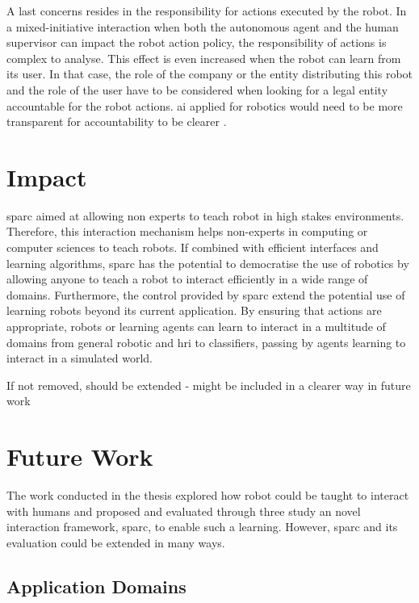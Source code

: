 A last concerns resides in the responsibility for actions executed by the robot. In a mixed-initiative interaction when both the autonomous agent and the human supervisor can impact the robot action policy, the responsibility of actions is complex to analyse. This effect is even increased when the robot can learn from its user. In that case, the role of the company or the entity distributing this robot and the role of the user have to be considered when looking for a legal entity accountable for the robot actions. \gls{ai} applied for robotics would need to be more transparent for accountability to be clearer \citep{wachter2017transparent}.

\section{Impact}

\gls{sparc} aimed at allowing non experts to teach robot in high stakes environments. Therefore, this interaction mechanism helps non-experts in computing or computer sciences to teach robots. If combined with efficient interfaces and learning algorithms, \gls{sparc} has the potential to democratise the use of robotics by allowing anyone to teach a robot to interact efficiently in a wide range of domains. Furthermore, the control provided by \gls{sparc} extend the potential use of learning robots beyond its current application. By ensuring that actions are appropriate, robots or learning agents can learn to interact in a multitude of domains from general robotic and \gls{hri} to classifiers, passing by agents learning to interact in a simulated world.

If not removed, should be extended - might be included in a clearer way in future work
\section{Future Work}

The work conducted in the thesis explored how robot could be taught to interact with humans and proposed and evaluated through three study an novel interaction framework, \gls{sparc}, to enable such a learning. However, \gls{sparc} and its evaluation could be extended in many ways.

\subsection{Application Domains}

